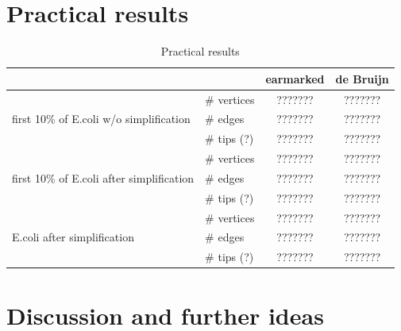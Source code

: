 \documentclass[12pt]{article}
\begin{document}
\section{Practical results}

\begin{table}
\begin{center}
\begin{tabular}{llcc}
\toprule
& & earmarked & de Bruijn\\

\midrule
\multirow{3}{*}{first 10\% of E.coli w/o simplification} & \# vertices & ??????? & ???????\\
\cmidrule(r){2-4}
& \# edges & ??????? & ???????\\
\cmidrule(r){2-4}
& \# tips (?) & ??????? & ???????\\

\midrule
\multirow{3}{*}{first 10\% of E.coli after simplification} & \# vertices & ??????? & ???????\\
\cmidrule(r){2-4}
& \# edges & ??????? & ???????\\
\cmidrule(r){2-4}
& \# tips (?) & ??????? & ???????\\

\midrule
\multirow{3}{*}{E.coli after simplification} & \# vertices & ??????? & ???????\\
\cmidrule(r){2-4}
& \# edges & ??????? & ???????\\
\cmidrule(r){2-4}
& \# tips (?) & ??????? & ???????\\

\bottomrule
\end{tabular}
\caption{Practical results}\label{table:practical}
\end{center}
\end{table}



\section{Discussion and further ideas}

%





\end{document}
